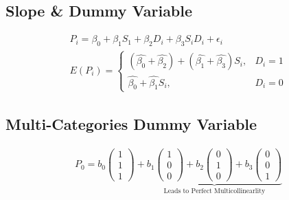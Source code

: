 \documentclass[openany,b5paper]{article}
\begin{document}
\subsection{Slope \& Dummy Variable}
\begin{align}
	P_i = \beta_0 + \beta_1 S_1 + \beta_2  D_i + \beta_3 S_i D_i + \epsilon_i\\
	E(P_i) =
	\begin{cases}
		(\hat{\beta_0} + \hat{\beta_2}) + \left(\hat{\beta_1}+\hat{\beta_3} \right)S_i, &D_i = 1\\
		\hat{\beta_0} + \hat{\beta_1}S_i, &D_i = 0
	\end{cases}
\end{align}

\begin{center}
\end{center}

\subsection{Multi-Categories Dummy Variable}
\begin{align}
	P_0 = b_0 \begin{pmatrix} 1 \\ 1 \\ 1\end{pmatrix} + \underbrace{b_1 \begin{pmatrix} 1 \\ 0 \\ 0\end{pmatrix} + b_2 \begin{pmatrix} 0 \\ 1 \\ 0\end{pmatrix} +b_3 \begin{pmatrix} 0 \\ 0 \\ 1\end{pmatrix}}_{\text{Leads to Perfect Multicollinearlity}}
\end{align}
\end{document}
